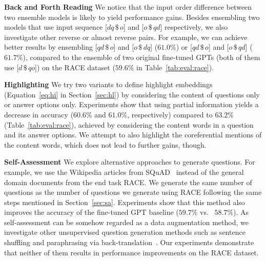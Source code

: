 \documentclass[11pt,a4paper]{article}
\newcommand{\vs}{{vs.}}
\begin{document}
\textbf{Back and Forth Reading} We notice that the input order difference between two ensemble models is likely to yield performance gains. Besides ensembling two models that use input sequence [$dq \, \$\, o$] and [$ o\, \$\,qd$] respectively, we also investigate other reverse or almost reverse pairs. For example, we can achieve better results by ensembling [$qd \, \$\, o$] and [$o\, \$\,dq$] ($61.0\%$) or [$qd \, \$\, o$] and [$o\, \$\,qd$] ($61.7\%$), compared to the ensemble of two original fine-tuned GPTs (both of them use [$d\, \$\,qo$]) on the RACE dataset ($59.6\%$ in Table~\ref{tab:eval:race}). 




\textbf{Highlighting} We try two variants to define highlight embeddings (Equation~\ref{eq:hi} in Section~\ref{sec:hl}) by considering the content of questions only or answer options only. Experiments show that using partial information yields a decrease in accuracy ($60.6\%$ and $61.0\%$, respectively) compared to $63.2\%$ (Table~\ref{tab:eval:race}), achieved by considering the content words in a question and its answer options. We attempt to also highlight the coreferential mentions of the content words, which does not lead to further gains, though.
















\textbf{Self-Assessment} We explore alternative approaches to generate questions. For example, we use the Wikipedia articles from SQuAD~\cite{rajpurkar2016squad} instead of the general domain documents from the end task RACE. We generate the same number of questions as the number of questions we generate using RACE following the same steps mentioned in Section~\ref{sec:sa}. Experiments show that this method also improves the accuracy of the fine-tuned GPT baseline ($59.7\%$ \vs~ $58.7\%$).
As self-assessment can be somehow regarded as a data augmentation method, we investigate other unsupervised question generation methods such as sentence shuffling and paraphrasing via back-translation~\cite{ding2018ynu,yu2018qanet}. Our experiments demonstrate that neither of them results in performance improvements on the RACE dataset. 
\end{document}

